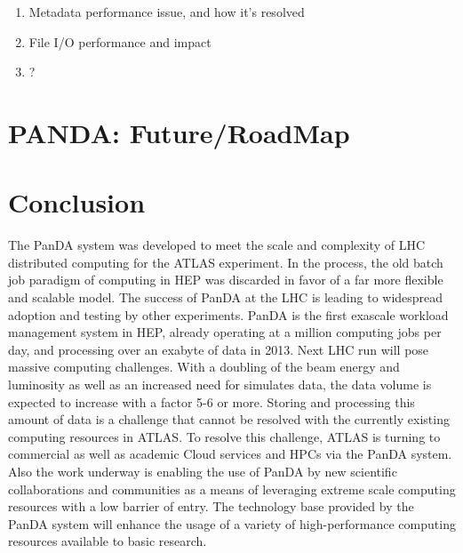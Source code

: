 \documentclass[10pt, conference, compsocconf]{IEEEtran}
\begin{document}
\begin{enumerate}
  \item Metadata performance issue, and how it’s resolved
  \item File I/O performance and impact
  \item ?
\end{enumerate}

\section{PANDA: Future/RoadMap}
\label{sec:panda_roadmap}

 \section{Conclusion}\label{sec:conclusion}
The PanDA  system was developed to meet the scale and complexity of LHC distributed computing for the ATLAS experiment.  In the process,  the old batch job paradigm  of computing in HEP was  discarded  in favor of a  far more flexible and scalable  model. The success  of PanDA  at the LHC is leading to widespread adoption and testing by other experiments. PanDA  is the first exascale  workload management system in HEP, already operating at a million computing jobs per day, and processing over an exabyte of data in 2013. Next LHC run will pose massive computing  challenges. With a  doubling of the beam  energy  and luminosity as  well as an increased  need for  simulates  data, the data volume is expected to increase with a factor 5-6 or more. Storing and processing  this amount of data is a  challenge   that cannot be resolved with the currently existing  computing  resources in ATLAS. To resolve this challenge, ATLAS is turning to commercial  as well as academic Cloud services and HPCs via the PanDA system. Also the work underway is enabling the use of PanDA by new scientific collaborations and communities as a means  of leveraging  extreme scale computing  resources with a low barrier of entry. The technology base provided by the PanDA system will enhance the usage of a variety  of high-performance computing resources available to basic research.





\end{document}
